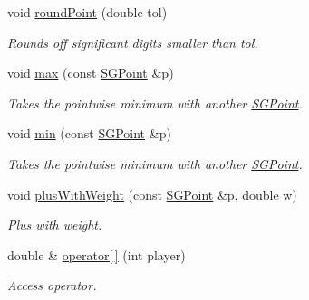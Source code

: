 \begin{DoxyCompactItemize}
\mbox{\label{classSGPoint_a0eaedf1dcee422b6c31037e9fc5a42c0}} 
void \hyperlink{classSGPoint_a0eaedf1dcee422b6c31037e9fc5a42c0}{round\+Point} (double tol)
\begin{DoxyCompactList}\small\item\em Rounds off significant digits smaller than tol. \end{DoxyCompactList}\item 
\mbox{\label{classSGPoint_aa1de2bc64f504756f62f3a27e15a07c7}} 
void \hyperlink{classSGPoint_aa1de2bc64f504756f62f3a27e15a07c7}{max} (const \hyperlink{classSGPoint}{S\+G\+Point} \&p)
\begin{DoxyCompactList}\small\item\em Takes the pointwise minimum with another \hyperlink{classSGPoint}{S\+G\+Point}. \end{DoxyCompactList}\item 
\mbox{\label{classSGPoint_a06309da77645ba91101f4dedd20bd888}} 
void \hyperlink{classSGPoint_a06309da77645ba91101f4dedd20bd888}{min} (const \hyperlink{classSGPoint}{S\+G\+Point} \&p)
\begin{DoxyCompactList}\small\item\em Takes the pointwise minimum with another \hyperlink{classSGPoint}{S\+G\+Point}. \end{DoxyCompactList}\item 
\mbox{\label{classSGPoint_a2765a3da927795452e3b027cf604408f}} 
void \hyperlink{classSGPoint_a2765a3da927795452e3b027cf604408f}{plus\+With\+Weight} (const \hyperlink{classSGPoint}{S\+G\+Point} \&p, double w)
\begin{DoxyCompactList}\small\item\em Plus with weight. \end{DoxyCompactList}\item 
\mbox{\label{classSGPoint_af7c0c916beac10b2c7792a5298cd0600}} 
double \& \hyperlink{classSGPoint_af7c0c916beac10b2c7792a5298cd0600}{operator\mbox{[}$\,$\mbox{]}} (int player)
\begin{DoxyCompactList}\small\item\em Access operator. \end{DoxyCompactList}\item 
\mbox{\label{classSGPoint_a7aab30d800bf16c973379589916c87b4}} 

\end{DoxyCompactItemize}
